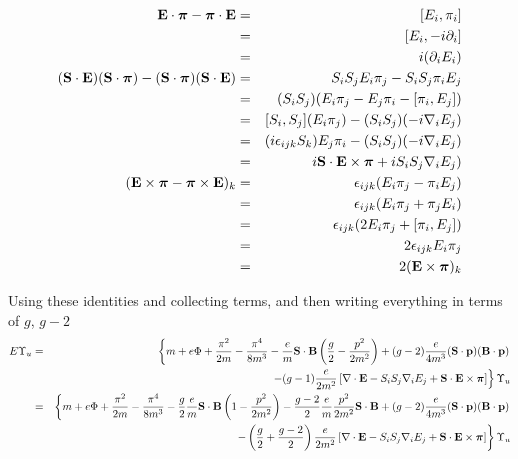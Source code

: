 \begin{eqnarray*}
\mathbf{E} \cdot \mbox{\boldmath$ \pi $} - \mbox{\boldmath$ \pi $} \cdot \mathbf{E}
	&=&	[E_i, \pi_i]			\\
	&=&	[E_i, -i\partial_i]	\\
	&=&	i(\partial_i E_i)		\\
(\mathbf{S} \cdot \mathbf{E}) (\mathbf{S} \cdot \mbox{\boldmath$ \pi $}) - (\mathbf{S} \cdot \mbox{\boldmath$ \pi $}) (\mathbf{S} \cdot \mathbf{E})
	&=&	S_i S_j E_i \pi_j - S_i S_j \pi_i E_j						\\
	&=&	(S_i S_j) (E_i \pi_j - E_j \pi_i - [\pi_i, E_j])					\\
	&=&	[S_i, S_j](E_i \pi_j) - (S_i S_j)(-i \nabla_i E_j)				\\
	&=&	(i\epsilon_{ijk}S_k)E_j \pi_i -  (S_i S_j)(-i \nabla_i E_j)		\\
	&=&	i \mathbf{S} \cdot \mathbf{E} \times \mbox{\boldmath$ \pi $} + i S_i S_j \nabla_i E_j)	\\
(\mathbf{E} \times \mbox{\boldmath$ \pi $} - \mbox{\boldmath$ \pi $} \times \mathbf{E})_k
	&=&	\epsilon_{ijk}(E_i \pi_j - \pi_i E_j)		\\
	&=&	\epsilon_{ijk}(E_i \pi_j + \pi_j E_i)		\\
	&=&	\epsilon_{ijk}(2 E_i \pi_j + [\pi_i, E_j])	\\
	&=&	2 \epsilon_{ijk} E_i \pi_j				\\
	&=&	2 (\mathbf{E} \times \mbox{\boldmath$ \pi $})_k
\end{eqnarray*}

Using these identities and collecting terms, and then writing everything in terms of $g$, $g-2$
\begin{eqnarray*}
	E \Upsilon_u 
		&=&\left\{ m + e\Phi + \frac{\pi^2}{2m} - \frac{\pi^4 } {8m^3}
			- \frac{e}{m} \mathbf{S} \cdot \mathbf{B} \left ( \frac{g}{2} - \frac{p^2}{2m^2} \right )
			+ (g-2)\frac{e}{4m^3} (\mathbf{S} \cdot \mathbf{p}) (\mathbf{B} \cdot \mathbf{p})	\right. \\
		&&	\left.
			- (g-1)\frac{e}{2m^2} 
				\left [ 
					\mathbf{\nabla} \cdot \mathbf{E} 
					- S_i S_j \nabla_i E_j +\mathbf{S} \cdot \mathbf{E} \times \mbox{\boldmath$ \pi $}
				\right ]
			\right\}\Upsilon_u	\\
		&=& \left\{ m + e\Phi + \frac{\pi^2}{2m} - \frac{\pi^4 } {8m^3}
			- \frac{g}{2}\frac{e}{m} \mathbf{S} \cdot \mathbf{B} \left ( 1 - \frac{p^2}{2m^2} \right )
			- \frac{g-2}{2} \frac{e}{m} \frac{p^2}{2m^2} \mathbf{S} \cdot \mathbf{B} 
			+ (g-2)\frac{e}{4m^3} (\mathbf{S} \cdot \mathbf{p}) (\mathbf{B} \cdot \mathbf{p})	\right.	\\
		&&	\left.
			- \left ( \frac{g}{2} + \frac{g-2}{2} \right) \frac{e}{2m^2} 
				\left [ 
					\mathbf{\nabla} \cdot \mathbf{E} 
					- S_i S_j \nabla_i E_j +\mathbf{S} \cdot \mathbf{E} \times \mbox{\boldmath$ \pi $}
				\right ]
			\right\}\Upsilon_u
\end{eqnarray*}
			
